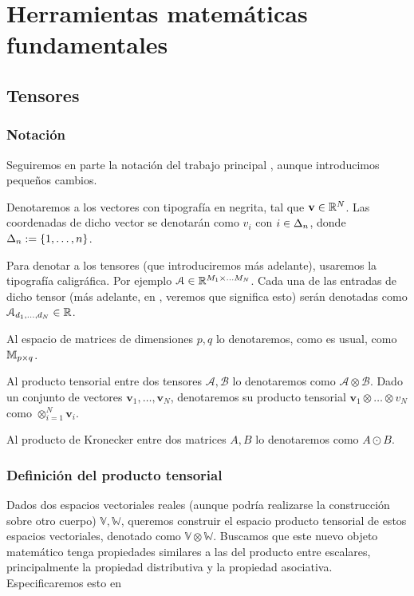 \chapter{Herramientas matemáticas fundamentales}

\section{Tensores}

\subsection{Notación}

Seguiremos en parte la notación del trabajo principal \cite{matematicas:principal}, aunque introducimos pequeños cambios.

Denotaremos a los vectores con tipografía en negrita, tal que $\mathbf{v} \in \mathbb{R}^N$. Las coordenadas de dicho vector se denotarán como $v_i$ con $i \in \Delta_{n}$, donde $\Delta_{n} := \{1, \ldots, n\}$.

Para denotar a los tensores (que introduciremos más adelante), usaremos la tipografía caligráfica. Por ejemplo $\mathcal{A} \in \mathbb{R}^{M_1 \times \ldots M_N}$. Cada una de las entradas de dicho tensor (más adelante, en , veremos que significa esto) serán denotadas como $\mathcal{A}_{d_1, \ldots, d_N} \in \mathbb{R}$.

Al espacio de matrices de dimensiones $p, q$ lo denotaremos, como es usual, como $\mathbb{M}_{p \times q}$.

Al producto tensorial entre dos tensores $\mathcal{A}, \mathcal{B}$ lo denotaremos como $\mathcal{A} \otimes \mathcal{B}$. Dado un conjunto de vectores $\mathbf{v}_1, \ldots, \mathbf{v}_N$, denotaremos su producto tensorial $\mathbf{v}_1 \otimes \ldots \otimes {v}_N$ como $\otimes_{i = 1}^N \mathbf{v}_i$.

Al producto de Kronecker entre dos matrices $A, B$ lo denotaremos como $A \odot B$.

\subsection{Definición del producto tensorial} \label{sec:deftensor}

Dados dos espacios vectoriales reales (aunque podría realizarse la construcción sobre otro cuerpo) $\mathbb{V}, \mathbb{W}$, queremos construir el espacio producto tensorial de estos espacios vectoriales, denotado como $\mathbb{V} \otimes \mathbb{W}$. Buscamos que este nuevo objeto matemático tenga propiedades similares a las del producto entre escalares, principalmente la propiedad distributiva y la propiedad asociativa. Especificaremos esto en 

